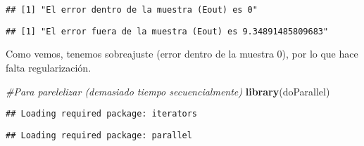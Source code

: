 \documentclass[]{article}
\newenvironment{Shaded}{\begin{snugshade}}{\end{snugshade}}
\newcommand{\KeywordTok}[1]{\textcolor[rgb]{0.13,0.29,0.53}{\textbf{#1}}}
\newcommand{\DataTypeTok}[1]{\textcolor[rgb]{0.13,0.29,0.53}{#1}}
\newcommand{\DecValTok}[1]{\textcolor[rgb]{0.00,0.00,0.81}{#1}}
\newcommand{\StringTok}[1]{\textcolor[rgb]{0.31,0.60,0.02}{#1}}
\newcommand{\CommentTok}[1]{\textcolor[rgb]{0.56,0.35,0.01}{\textit{#1}}}
\newcommand{\OperatorTok}[1]{\textcolor[rgb]{0.81,0.36,0.00}{\textbf{#1}}}
\newcommand{\NormalTok}[1]{#1}
\begin{document}
\begin{verbatim}
## [1] "El error dentro de la muestra (Eout) es 0"
\end{verbatim}

\begin{Shaded}
\end{Shaded}

\begin{verbatim}
## [1] "El error fuera de la muestra (Eout) es 9.34891485809683"
\end{verbatim}

Como vemos, tenemos sobreajuste (error dentro de la muestra 0), por lo
que hace falta regularización.

\begin{Shaded}
\begin{Highlighting}[]
\CommentTok{#Para parelelizar (demasiado tiempo secuencialmente)}
\KeywordTok{library}\NormalTok{(doParallel)}
\end{Highlighting}
\end{Shaded}

\begin{verbatim}
## Loading required package: iterators
\end{verbatim}

\begin{verbatim}
## Loading required package: parallel
\end{verbatim}
\end{document}
